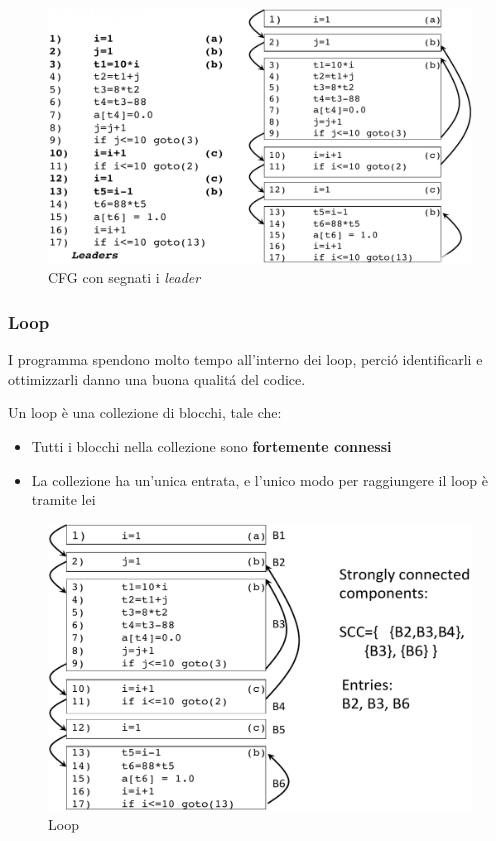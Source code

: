 \begin{figure}[H]
  \centering
  \includegraphics[scale=0.35]{res/image/leader_block}
  \caption{CFG con segnati i \textit{leader}}
  \label{img:leader_block}
\end{figure}

\subsubsection{Loop}
I programma spendono molto tempo all'interno dei loop, perci\'o identificarli e
ottimizzarli danno una buona qualit\'a del codice.

\begin{definition}[Loop]
Un loop \`e una collezione di blocchi, tale che:
\begin{itemize}
\item Tutti i blocchi nella collezione sono \textbf{fortemente connessi}
\item La collezione ha un'unica entrata, e l'unico modo per raggiungere il loop
\`e tramite lei
\end{itemize}
\end{definition}

\begin{figure}[H]
  \centering
  \includegraphics[scale=0.4]{res/image/loop}
  \caption{Loop}
  \label{img:loop}
\end{figure}

